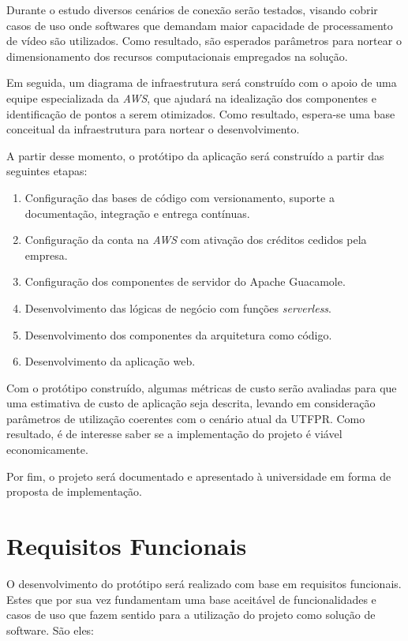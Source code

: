 Durante o estudo diversos cenários de conexão serão testados, visando cobrir casos de uso onde softwares que demandam maior capacidade de processamento de vídeo são utilizados. Como resultado, são esperados parâmetros para nortear o dimensionamento dos recursos computacionais empregados na solução.

Em seguida, um diagrama de infraestrutura será construído com o apoio de uma equipe especializada da \textit{AWS}, que ajudará na idealização dos componentes e identificação de pontos a serem otimizados. Como resultado, espera-se uma base conceitual da infraestrutura para nortear o desenvolvimento.

A partir desse momento, o protótipo da aplicação será construído a partir das seguintes etapas:

\begin{enumerate}
    \item Configuração das bases de código com versionamento, suporte a documentação, integração e entrega contínuas.
    \item Configuração da conta na \textit{AWS} com ativação dos créditos cedidos pela empresa.
    \item Configuração dos componentes de servidor do Apache Guacamole.
    \item Desenvolvimento das lógicas de negócio com funções \textit{serverless}.
    \item Desenvolvimento dos componentes da arquitetura como código.
    \item Desenvolvimento da aplicação web.
\end{enumerate}

Com o protótipo construído, algumas métricas de custo serão avaliadas para que uma estimativa de custo de aplicação seja descrita, levando em consideração parâmetros de utilização coerentes com o cenário atual da UTFPR. Como resultado, é de interesse saber se a implementação do projeto é viável economicamente.

Por fim, o projeto será documentado e apresentado à universidade em forma de proposta de implementação.

\section{Requisitos Funcionais}\label{sec:requisitosFuncionais}

O desenvolvimento do protótipo será realizado com base em requisitos funcionais. Estes que por sua vez fundamentam uma base aceitável de funcionalidades e casos de uso que fazem sentido para a utilização do projeto como solução de software. São eles:


